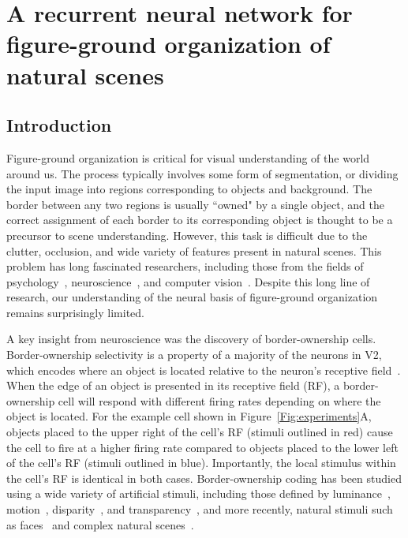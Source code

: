 \chapter{A recurrent neural network for figure-ground organization of natural scenes}
\label{sec:natural_image}

\section{Introduction}

Figure-ground organization is critical for visual understanding of the world around us. The process typically involves some form of segmentation, or dividing the input image into regions corresponding to objects and background. The border between any two regions is usually ``owned" by a single object, and the correct assignment of each border to its corresponding object is thought to be a precursor to scene understanding.
However, this task is difficult due to the clutter, occlusion, and wide variety of features present in natural scenes. This problem has long fascinated researchers, including those from the fields of psychology~\citep{Wertheimer23,Koffka35}, neuroscience~\citep{Zhou_etal00,Craft_etal07}, and computer vision~\citep{Sajda_Finkel95,Ren_etal06,Teo_etal15,Wang_Yuille16}.
Despite this long line of research, our understanding of the neural basis of figure-ground organization remains surprisingly limited.

A key insight from neuroscience was the discovery of border-ownership
cells. Border-ownership selectivity is a property of a majority of the
neurons in V2, which encodes where an object is located relative to the
neuron's receptive field~\citep{Zhou_etal00}.
When the edge of an object is presented in its receptive field (RF), a border-ownership cell will respond with different firing rates depending on where the object is located.
For the example cell shown in Figure~\ref{Fig:experiments}A, objects placed to the upper right of the cell's RF (stimuli outlined in red) cause the cell to fire at a higher firing rate compared to objects placed to the lower left of the cell's RF (stimuli outlined in blue). Importantly, the local stimulus within the cell's RF is identical in both cases. Border-ownership coding has been studied using a wide variety of artificial stimuli, including those defined by luminance~\citep{Zhou_etal00}, motion~\citep{vonderHeydt_etal03a}, disparity~\citep{Qiu_vonderHeydt05}, and transparency~\citep{Qiu_vonderHeydt07}, and more recently, natural stimuli such as faces~\citep{Hesse_Tsao16,Ko_vonderHeydt17} and complex natural scenes~\citep{Williford_vonderHeydt16}.

